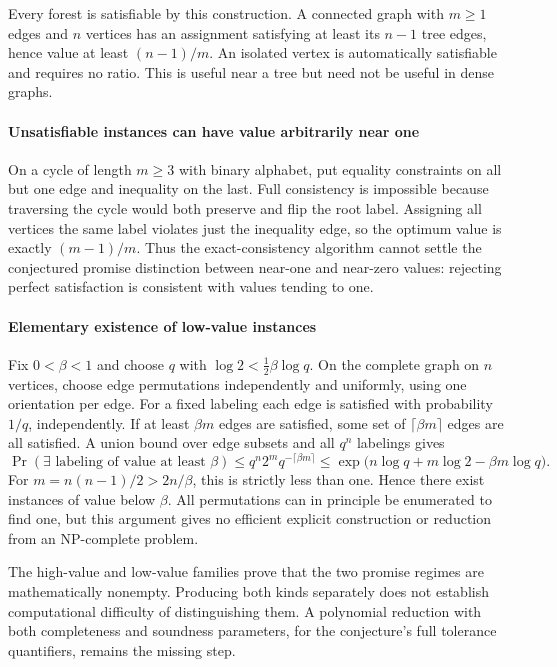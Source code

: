 \documentclass[11pt]{article}
\begin{document}
Every forest is satisfiable by this construction. A connected graph with $m\geq1$ edges and $n$ vertices has an assignment satisfying at least its $n-1$ tree edges, hence value at least $(n-1)/m$. An isolated vertex is automatically satisfiable and requires no ratio. This is useful near a tree but need not be useful in dense graphs.

\paragraph{Unsatisfiable instances can have value arbitrarily near one}
On a cycle of length $m\geq3$ with binary alphabet, put equality constraints on all but one edge and inequality on the last. Full consistency is impossible because traversing the cycle would both preserve and flip the root label. Assigning all vertices the same label violates just the inequality edge, so the optimum value is exactly $(m-1)/m$. Thus the exact-consistency algorithm cannot settle the conjectured promise distinction between near-one and near-zero values: rejecting perfect satisfaction is consistent with values tending to one.

\paragraph{Elementary existence of low-value instances}
Fix $0<\beta<1$ and choose $q$ with $\log2<\tfrac12\beta\log q$. On the complete graph on $n$ vertices, choose edge permutations independently and uniformly, using one orientation per edge. For a fixed labeling each edge is satisfied with probability $1/q$, independently. If at least $\beta m$ edges are satisfied, some set of $\lceil\beta m\rceil$ edges are all satisfied. A union bound over edge subsets and all $q^n$ labelings gives
\[
 \Pr(\exists\text{ labeling of value at least }\beta)
 \leq q^n2^m q^{-\lceil\beta m\rceil}
 \leq\exp\bigl(n\log q+m\log2-\beta m\log q\bigr).
\]
For $m=n(n-1)/2>2n/\beta$, this is strictly less than one. Hence there exist instances of value below $\beta$. All permutations can in principle be enumerated to find one, but this argument gives no efficient explicit construction or reduction from an NP-complete problem.

The high-value and low-value families prove that the two promise regimes are mathematically nonempty. Producing both kinds separately does not establish computational difficulty of distinguishing them. A polynomial reduction with both completeness and soundness parameters, for the conjecture's full tolerance quantifiers, remains the missing step.
\end{document}
